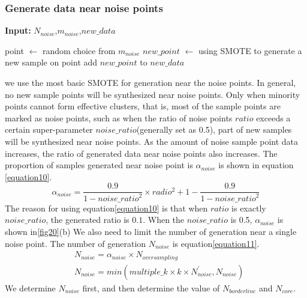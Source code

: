 \documentclass[runningheads]{llncs}
\begin{document}
\subsubsection{Generate data near noise points}
\begin{algorithm}[htbp]
  \caption{$generate\_noise$}
  \label{alg5}
  \hspace*{0.02in} {\bf Input:} $N_{noise}$,$m_{noise}$,$new\_data$
  \begin{algorithmic}
    \State point $\leftarrow$ random choice from $m_{noise}$
    \State $new\_point$ $\leftarrow$ using SMOTE to generate a new sample on point
    \State add $new\_point$ to $new\_data$
    \EndFor
  \end{algorithmic}
\end{algorithm}
we use the most basic SMOTE for generation near the noise points.
In general, no new sample points will be synthesized near noise points.
Only when minority points cannot form effective clusters, that is,
most of the sample points are marked as noise points, 
such as when the ratio of noise points $ratio$ exceeds a certain super-parameter $noise\_ratio$(generally set as 0.5),
part of new samples will be synthesized near noise points.
As the amount of noise sample point data increases, 
the ratio of generated data near noise points also increases. 
The proportion of samples generated near noise point is $\alpha_{noise}$ is shown in equation \ref{equation10}.
\begin{equation}
  \label{equation10}
  \alpha_{noise}=\frac{0.9}{1-{noise\_{ratio}}^2}\times radio^2+1-\frac{0.9}{1-{noise\_ratio}^2}
\end{equation}
The reason for using equation\ref{equation10} is that when $ratio$ is exactly
 $noise\_ratio$, the generated ratio is $0.1$.
When the $noise\_ratio$ is 0.5, $\alpha_{noise}$ is shown in\ref{fig20}(b)
We also need to limit the number of generation near a single noise point.
The number of generation $N_{noise}$ is equation\ref{equation11}.
\begin{equation}
  \label{equation11}
  \begin{aligned}
   &  N_{noise}=\alpha_{noise} \times N_{oversampling} \\
   & N_{noise}=min(multiple\_k \times k \times N^{'}_{noise}, N_{noise})
  \end{aligned}
\end{equation}
We determine $N_{noise}$ first, and then determine the value of $N_{borderline}$ and $N_{core}$.
\end{document}
